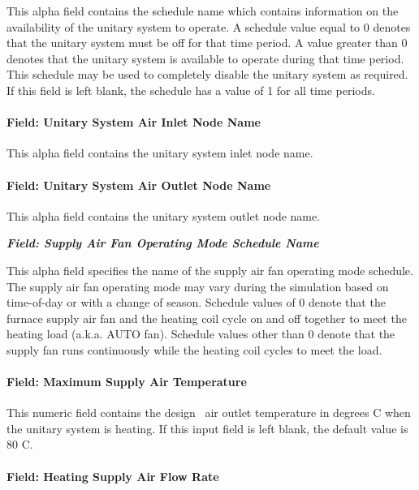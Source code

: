 This alpha field contains the schedule name which contains information on the availability of the unitary system to operate. A schedule value equal to 0 denotes that the unitary system must be off for that time period. A value greater than 0 denotes that the unitary system is available to operate during that time period. This schedule may be used to completely disable the unitary system as required. If this field is left blank, the schedule has a value of 1 for all time periods.

\paragraph{Field: Unitary System Air Inlet Node Name}\label{field-unitary-system-air-inlet-node-name-2}

This alpha field contains the unitary system inlet node name.

\paragraph{Field: Unitary System Air Outlet Node Name}\label{field-unitary-system-air-outlet-node-name-2}

This alpha field contains the unitary system outlet node name.

\textbf{\emph{Field: Supply Air Fan Operating Mode Schedule Name}}

This alpha field specifies the name of the supply air fan operating mode schedule. The supply air fan operating mode may vary during the simulation based on time-of-day or with a change of season. Schedule values of 0 denote that the furnace supply air fan and the heating coil cycle on and off together to meet the heating load (a.k.a. AUTO fan). Schedule values other than 0 denote that the supply fan runs continuously while the heating coil cycles to meet the load.

\paragraph{Field: Maximum Supply Air Temperature}\label{field-maximum-supply-air-temperature-4}

This numeric field contains the design~ air outlet temperature in degrees C when the unitary system is heating. If this input field is left blank, the default value is 80 C.

\paragraph{Field: Heating Supply Air Flow Rate}\label{field-heating-supply-air-flow-rate-5-000}

